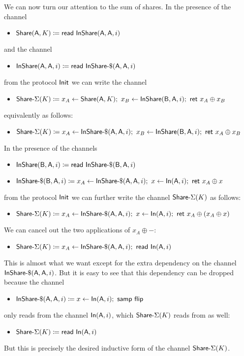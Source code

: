 \begin{itemize}
We can now turn our attention to the sum of shares. In the presence of the channel
\begin{itemize}
\item $\mathsf{Share}(\mathsf{A},K) \coloneqq \mathsf{read} \ \mathsf{InShare}(\mathsf{A},\mathsf{A},i)$
\end{itemize}
and the channel
\begin{itemize}
\item $\mathsf{InShare}(\mathsf{A},\mathsf{A},i) \coloneqq \mathsf{read} \ \mathsf{InShare}\textsf{-}\$(\mathsf{A},\mathsf{A},i)$
\end{itemize}
from the protocol $\mathsf{Init}$ we can write the channel
\begin{itemize}
\item $\mathsf{Share}\textsf{-}\Sigma(K) \coloneqq x_A \leftarrow \mathsf{Share}(\mathsf{A},K); \ x_B \leftarrow \mathsf{InShare}(\mathsf{B},\mathsf{A},i); \ \mathsf{ret} \ x_A \oplus x_B$
\end{itemize}
equivalently as follows:
\begin{itemize}
\item $\mathsf{Share}\textsf{-}\Sigma(K) \coloneqq x_A \leftarrow \mathsf{InShare}\textsf{-}\$(\mathsf{A},\mathsf{A},i); \ x_B \leftarrow \mathsf{InShare}(\mathsf{B},\mathsf{A},i); \ \mathsf{ret} \ x_A \oplus x_B$
\end{itemize}
In the presence of the channels
\begin{itemize}
\item $\mathsf{InShare}(\mathsf{B},\mathsf{A},i) \coloneqq \mathsf{read} \ \mathsf{InShare}\textsf{-}\$(\mathsf{B},\mathsf{A},i)$ 
\item $\mathsf{InShare}\textsf{-}\$(\mathsf{B},\mathsf{A},i) \coloneqq x_A \leftarrow \mathsf{InShare}\textsf{-}\$(\mathsf{A},\mathsf{A},i); \ x \leftarrow \mathsf{In}(\mathsf{A},i); \ \mathsf{ret} \ x_A \oplus x$
\end{itemize}
from the protocol $\mathsf{Init}$ we can further write the channel $\mathsf{Share}\textsf{-}\Sigma(K)$ as follows:
\begin{itemize}
\item $\mathsf{Share}\textsf{-}\Sigma(K) \coloneqq x_A \leftarrow \mathsf{InShare}\textsf{-}\$(\mathsf{A},\mathsf{A},i); \ x \leftarrow \mathsf{In}(\mathsf{A},i); \ \mathsf{ret} \ x_A \oplus (x_A \oplus x)$
\end{itemize}
We can cancel out the two applications of $x_A \oplus -$:
\begin{itemize}
\item $\mathsf{Share}\textsf{-}\Sigma(K) \coloneqq x_A \leftarrow \mathsf{InShare}\textsf{-}\$(\mathsf{A},\mathsf{A},i); \ \mathsf{read} \ \mathsf{In}(\mathsf{A},i)$
\end{itemize}
This is almost what we want except for the extra dependency on the channel $\mathsf{InShare}\textsf{-}\$(\mathsf{A},\mathsf{A},i)$. But it is easy to see that this dependency can be dropped because the channel
\begin{itemize}
\item $\mathsf{InShare}\textsf{-}\$(\mathsf{A},\mathsf{A},i) \coloneqq x \leftarrow \mathsf{In}(\mathsf{A},i); \ \mathsf{samp} \ \mathsf{flip}$
\end{itemize}
only reads from the channel $\mathsf{In}(\mathsf{A},i)$, which $\mathsf{Share}\textsf{-}\Sigma(K)$ reads from as well:\begin{itemize}
\item $\mathsf{Share}\textsf{-}\Sigma(K) \coloneqq \mathsf{read} \ \mathsf{In}(\mathsf{A},i)$
\end{itemize}
But this is precisely the desired inductive form of the channel $\mathsf{Share}\textsf{-}\Sigma(K)$.


\end{itemize}
